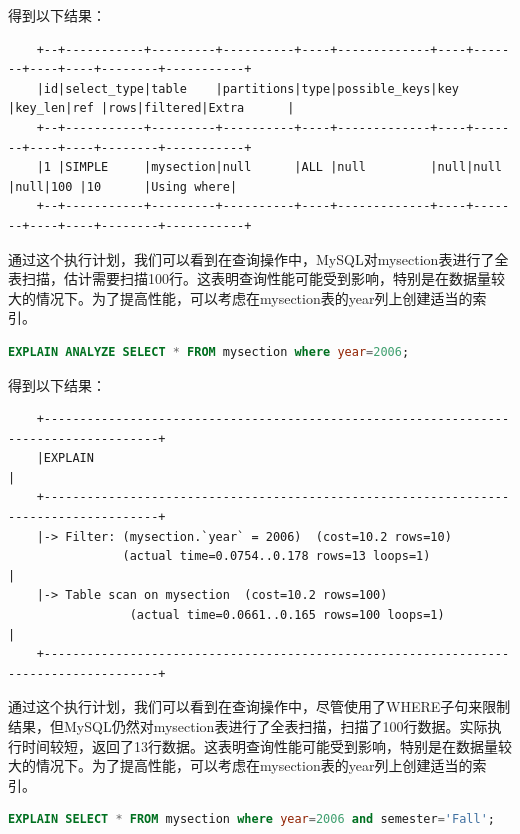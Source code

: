 \documentclass{article}
\begin{document}
	得到以下结果：
	
	\begin{verbatim}
	+--+-----------+---------+----------+----+-------------+----+-------+----+----+--------+-----------+
	|id|select_type|table    |partitions|type|possible_keys|key |key_len|ref |rows|filtered|Extra      |
	+--+-----------+---------+----------+----+-------------+----+-------+----+----+--------+-----------+
	|1 |SIMPLE     |mysection|null      |ALL |null         |null|null   |null|100 |10      |Using where|
	+--+-----------+---------+----------+----+-------------+----+-------+----+----+--------+-----------+
	\end{verbatim}
	
	通过这个执行计划，我们可以看到在查询操作中，MySQL对mysection表进行了全表扫描，估计需要扫描100行。这表明查询性能可能受到影响，特别是在数据量较大的情况下。为了提高性能，可以考虑在mysection表的year列上创建适当的索引。
	
	\begin{lstlisting}[language=sql, title=索引对查询性能的影响, tabsize=4]
	EXPLAIN ANALYZE SELECT * FROM mysection where year=2006;
	\end{lstlisting}
	
	得到以下结果：
	
	\begin{verbatim}
	+--------------------------------------------------------------------------------------+
	|EXPLAIN                                                                                                                                                                                                   |
	+--------------------------------------------------------------------------------------+
	|-> Filter: (mysection.`year` = 2006)  (cost=10.2 rows=10) 
	            (actual time=0.0754..0.178 rows=13 loops=1)                                |
	|-> Table scan on mysection  (cost=10.2 rows=100) 
	             (actual time=0.0661..0.165 rows=100 loops=1)                              |
	+--------------------------------------------------------------------------------------+
	\end{verbatim}
	
	通过这个执行计划，我们可以看到在查询操作中，尽管使用了WHERE子句来限制结果，但MySQL仍然对mysection表进行了全表扫描，扫描了100行数据。实际执行时间较短，返回了13行数据。这表明查询性能可能受到影响，特别是在数据量较大的情况下。为了提高性能，可以考虑在mysection表的year列上创建适当的索引。
	
	\begin{lstlisting}[language=sql, title=索引对查询性能的影响, tabsize=4]
	EXPLAIN SELECT * FROM mysection where year=2006 and semester='Fall';
	\end{lstlisting}
	
\end{document}
